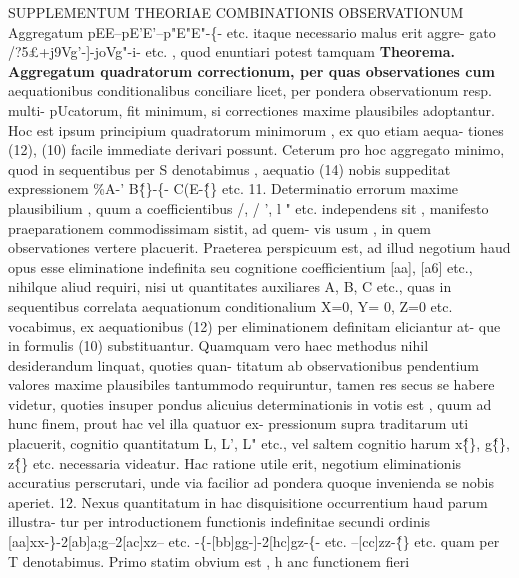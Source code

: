 \documentclass[12pt,a4paper]{article}
\begin{document}
 SUPPLEMENTUM THEORIAE COMBINATIONIS OBSERVATIONUM
Aggregatum pEE--pE'E'--p"E"E"-\{- etc. itaque necessario malus erit aggre-
gato /?5£+j9Vg'-]-joVg"-i- etc. , quod enuntiari potest tamquam
\noindent\textbf{Theorema. Aggregatum quadratorum correctionum, per quas observationes cum}
aequationibus conditionalibus conciliare licet, per pondera observationum resp. multi-
pUcatorum, fit minimum, si correctiones maxime plausibiles adoptantur.
Hoc est ipsum principium quadratorum minimorum , ex quo etiam aequa-
tiones (12), (10) facile immediate derivari possunt. Ceterum pro hoc aggregato
minimo, quod in sequentibus per S denotabimus , aequatio (14) nobis suppeditat
expressionem \%A-' B\^\{\}-\{- C(E-\^\{\} etc.
11.
Determinatio errorum maxime plausibilium , quum a coefficientibus /, / ', l "
etc. independens sit , manifesto praeparationem commodissimam sistit, ad quem-
vis usum , in quem observationes vertere placuerit. Praeterea perspicuum est, ad
illud negotium haud opus esse eliminatione indefinita seu cognitione coefficientium
[aa], [a6] etc., nihilque aliud requiri, nisi ut quantitates auxiliares A, B, C etc.,
quas in sequentibus correlata aequationum conditionalium X=0, Y= 0, Z=0
etc. vocabimus, ex aequationibus (12) per eliminationem definitam eliciantur at-
que in formulis (10) substituantur.
Quamquam vero haec methodus nihil desiderandum linquat, quoties quan-
titatum ab observationibus pendentium valores maxime plausibiles tantummodo
requiruntur, tamen res secus se habere videtur, quoties insuper pondus alicuius
determinationis in votis est , quum ad hunc finem, prout hac vel illa quatuor ex-
pressionum supra traditarum uti placuerit, cognitio quantitatum L, L', L" etc.,
vel saltem cognitio harum x\^\{\}, g\^\{\}, z\^\{\} etc. necessaria videatur. Hac ratione utile
erit, negotium eliminationis accuratius perscrutari, unde via facilior ad pondera
quoque invenienda se nobis aperiet.
12.
Nexus quantitatum in hac disquisitione occurrentium haud parum illustra-
tur per introductionem functionis indefinitae secundi ordinis
[aa]xx-\}-2[ab]a;g--2[ac]xz-- etc. -\{-[bb]gg-]-2[hc]gz-\{- etc. --[cc]zz-\^\{\} etc.
quam per T denotabimus. Primo statim obvium est , h anc functionem fieri
\end{document}
